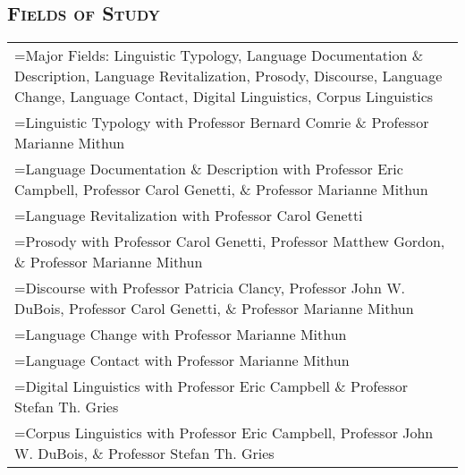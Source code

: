 \subsection*{\large\scshape{}Fields of Study}
\vspace{-1em}

\begin{longtabu} to 

  Major Fields: Linguistic Typology, Language Documentation \& Description, Language Revitalization, Prosody, Discourse, Language Change, Language Contact, Digital Linguistics, Corpus Linguistics\\

  Linguistic Typology with Professor Bernard Comrie \& Professor Marianne Mithun\\

  Language Documentation \& Description with Professor Eric Campbell, Professor Carol Genetti, \& Professor Marianne Mithun\\

  Language Revitalization with Professor Carol Genetti\\

  Prosody with Professor Carol Genetti, Professor Matthew Gordon, \& Professor Marianne Mithun\\

  Discourse with Professor Patricia Clancy, Professor John W. DuBois, Professor Carol Genetti, \& Professor Marianne Mithun\\

  Language Change with Professor Marianne Mithun\\

  Language Contact with Professor Marianne Mithun\\

  Digital Linguistics with Professor Eric Campbell \& Professor Stefan Th. Gries\\

  Corpus Linguistics with Professor Eric Campbell, Professor John W. DuBois, \& Professor Stefan Th. Gries

\end{longtabu}

\doublespacing
